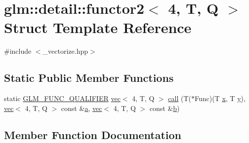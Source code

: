 \hypertarget{structglm_1_1detail_1_1functor2_3_014_00_01_t_00_01_q_01_4}{}\section{glm\+:\+:detail\+:\+:functor2$<$ 4, T, Q $>$ Struct Template Reference}
\label{structglm_1_1detail_1_1functor2_3_014_00_01_t_00_01_q_01_4}


{\ttfamily \#include $<$\+\_\+vectorize.\+hpp$>$}

\subsection*{Static Public Member Functions}
\begin{DoxyCompactItemize}
\item 
static \mbox{\hyperlink{setup_8hpp_a33fdea6f91c5f834105f7415e2a64407}{G\+L\+M\+\_\+\+F\+U\+N\+C\+\_\+\+Q\+U\+A\+L\+I\+F\+I\+ER}} \mbox{\hyperlink{structglm_1_1vec}{vec}}$<$ 4, T, Q $>$ \mbox{\hyperlink{structglm_1_1detail_1_1functor2_3_014_00_01_t_00_01_q_01_4_aaf4c70145020e3cbfdc975eee7f9a9cd}{call}} (T($\ast$Func)(T \mbox{\hyperlink{_s_d_l__opengl_8h_ad0e63d0edcdbd3d79554076bf309fd47}{x}}, T \mbox{\hyperlink{_s_d_l__opengl_8h_a1675d9d7bb68e1657ff028643b4037e3}{y}}), \mbox{\hyperlink{structglm_1_1vec}{vec}}$<$ 4, T, Q $>$ const \&\mbox{\hyperlink{_s_d_l__opengl__glext_8h_a3309789fc188587d666cda5ece79cf82}{a}}, \mbox{\hyperlink{structglm_1_1vec}{vec}}$<$ 4, T, Q $>$ const \&\mbox{\hyperlink{_s_d_l__opengl__glext_8h_a0f71581a41fd2264c8944126dabbd010}{b}})
\end{DoxyCompactItemize}


\subsection{Member Function Documentation}
\mbox{\label{structglm_1_1detail_1_1functor2_3_014_00_01_t_00_01_q_01_4_aaf4c70145020e3cbfdc975eee7f9a9cd}} 
